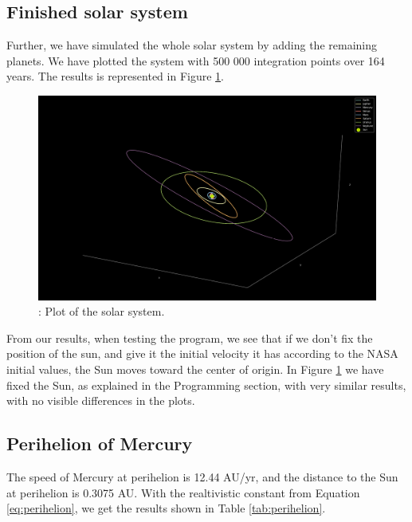 \documentclass{article}
\begin{document}
        \subsection{Finished solar system}
            Further, we have simulated the whole solar system by adding the remaining planets. We have plotted the system with 500 000 integration points over 164 years. The results is represented in Figure \ref{fig:solar}.

            \begin{figure}[H]
                \begin{center}
                    \includegraphics[width=1.2\textwidth]{./Plot/Solar_System.png}
                    \caption{: Plot of the solar system.}
                    \label{fig:solar}
                \end{center}
            \end{figure}

            From our results, when testing the program, we see that if we don't fix the position of the sun, and give it the initial velocity it has according to the NASA initial values, the Sun moves toward the center of origin. In Figure \ref{fig:solar} we have fixed the Sun, as explained in the Programming section, with very similar results, with no visible differences in the plots.

        \subsection{Perihelion of Mercury}
            The speed of Mercury at perihelion is 12.44 AU/yr, and the distance to the Sun at perihelion is 0.3075 AU. With the realtivistic constant from Equation \ref{eq:perihelion}, we get the results shown in Table \ref{tab:perihelion}.
\end{document}
